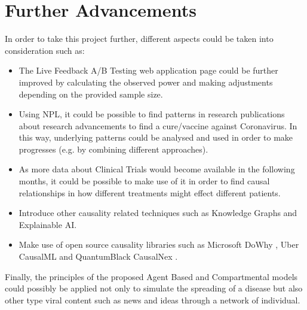 \section{Further Advancements}

In order to take this project further, different aspects could be taken into consideration such as:
\vspace{-0.2cm}
\begin{itemize}
    \item The Live Feedback A/B Testing web application page could be further improved by calculating the observed power and making adjustments depending on the provided sample size.
    \item Using NPL, it could be possible to find patterns in research publications about research advancements to find a cure/vaccine against Coronavirus. In this way, underlying patterns could be analysed and used in order to make progresses (e.g. by combining different approaches).
    \item As more data about Clinical Trials would become available in the following months, it could be possible to make use of it in order to find causal relationships in how different treatments might effect different patients. 
    \item Introduce other causality related techniques such as Knowledge Graphs and Explainable AI. 
    \item Make use of open source causality libraries such as Microsoft DoWhy \cite{dowhy}, Uber CausalML \cite{causalml} and QuantumBlack CausalNex \cite{causalnex}. 
\end{itemize}
\vspace{-0.2cm}

Finally, the principles of the proposed Agent Based and Compartmental models could possibly be applied not only to simulate the spreading of a disease but also other type viral content such as news and ideas through a network of individual.


